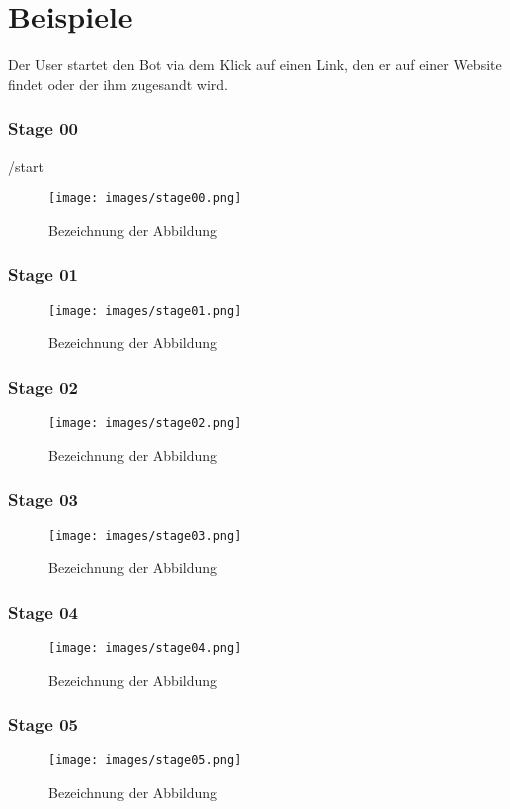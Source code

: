 \chapter{Beispiele}

Der User startet den Bot via dem Klick auf einen Link, den er auf einer Website findet oder der ihm zugesandt wird.

\subsection{Stage 00}
/start
\begin{figure} %
	\centering
	\texttt{[image: images/stage00.png]}
	\caption{Bezeichnung der Abbildung}
	\label{a1}
\end{figure}


\subsection{Stage 01}
\begin{figure} %
	\centering
	\texttt{[image: images/stage01.png]}
	\caption{Bezeichnung der Abbildung}
	\label{a1}
\end{figure}


\subsection{Stage 02}
\begin{figure} %
	\centering
	\texttt{[image: images/stage02.png]}
	\caption{Bezeichnung der Abbildung}
	\label{a1}
\end{figure}


\subsection{Stage 03}
\begin{figure} %
	\centering
	\texttt{[image: images/stage03.png]}
	\caption{Bezeichnung der Abbildung}
	\label{a1}
\end{figure}


\subsection{Stage 04}
\begin{figure} %
	\centering
	\texttt{[image: images/stage04.png]}
	\caption{Bezeichnung der Abbildung}
	\label{a1}
\end{figure}


\subsection{Stage 05}
\begin{figure} %
	\centering
	\texttt{[image: images/stage05.png]}
	\caption{Bezeichnung der Abbildung}
	\label{a1}
\end{figure}


